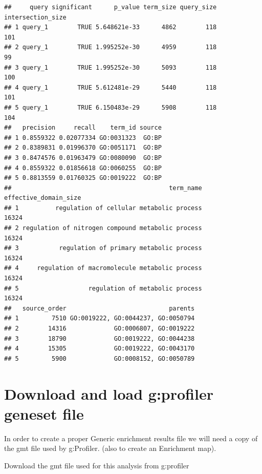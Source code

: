 \documentclass[
]{book}
\begin{document}
\begin{verbatim}
##     query significant      p_value term_size query_size intersection_size
## 1 query_1        TRUE 5.648621e-33      4862        118               101
## 2 query_1        TRUE 1.995252e-30      4959        118                99
## 3 query_1        TRUE 1.995252e-30      5093        118               100
## 4 query_1        TRUE 5.612481e-29      5440        118               101
## 5 query_1        TRUE 6.150483e-29      5908        118               104
##   precision     recall    term_id source
## 1 0.8559322 0.02077334 GO:0031323  GO:BP
## 2 0.8389831 0.01996370 GO:0051171  GO:BP
## 3 0.8474576 0.01963479 GO:0080090  GO:BP
## 4 0.8559322 0.01856618 GO:0060255  GO:BP
## 5 0.8813559 0.01760325 GO:0019222  GO:BP
##                                           term_name effective_domain_size
## 1          regulation of cellular metabolic process                 16324
## 2 regulation of nitrogen compound metabolic process                 16324
## 3           regulation of primary metabolic process                 16324
## 4     regulation of macromolecule metabolic process                 16324
## 5                   regulation of metabolic process                 16324
##   source_order                            parents
## 1         7510 GO:0019222, GO:0044237, GO:0050794
## 2        14316             GO:0006807, GO:0019222
## 3        18790             GO:0019222, GO:0044238
## 4        15305             GO:0019222, GO:0043170
## 5         5900             GO:0008152, GO:0050789
\end{verbatim}

\hypertarget{download-and-load-gprofiler-geneset-file}{%
\section{Download and load g:profiler geneset file}\label{download-and-load-gprofiler-geneset-file}}

In order to create a proper Generic enrichment results file we will need a copy of the gmt file used by g:Profiler. (also to create an Enrichment map).

Download the gmt file used for this analysis from g:profiler
\end{document}
